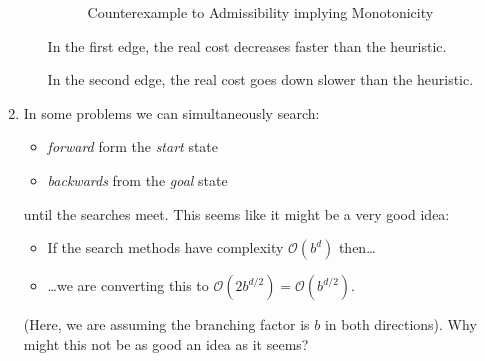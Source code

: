 \documentclass[10pt,\jkfside,a4paper]{article}
\begin{document}
\begin{enumerate}
\begin{itemize}
\begin{figure}[H]
\centering
{}
\caption{Counterexample to Admissibility implying Monotonicity}
\end{figure}

{\color{blue}
In the first edge, the real cost decreases faster than the heuristic.

In the second edge, the real cost goes down slower than the heuristic.
}

\end{itemize}

\setcounter{enumi}{6}

\item In some problems we can simultaneously search:
\begin{itemize}

\item \textit{forward} form the \textit{start} state

\item \textit{backwards} from the \textit{goal} state

\end{itemize}
until the searches meet. This seems like it might be a very good idea:
\begin{itemize}

\item If the search methods have complexity $\mathcal O\left(b^d\right)$
then\ldots

\item \ldots we are converting this to $\mathcal O\left( 2 b^{d/2} \right) =
\mathcal O\left( b^{d/2} \right) $.

\end{itemize}
(Here, we are assuming the branching factor is $b$ in both directions). Why
might this not be as good an idea as it seems?


\end{enumerate}
\end{document}
